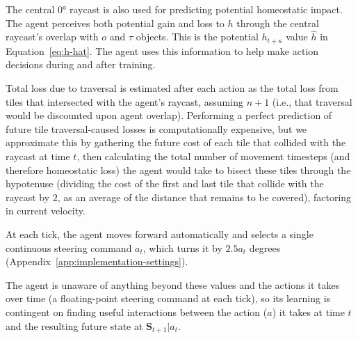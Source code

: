 \documentclass[12pt,fleqn]{article}
\begin{document}
The central 0° raycast is also used for predicting potential homeostatic impact. The agent perceives both potential gain and loss to \(h\) through the central raycast's  overlap with \(o\) and \(\tau\) objects. This is the potential \(h_{t+\kappa}\) value \(\hat{h}\) in Equation~\ref{eq:h-hat}. The agent uses this information to help make action decisions during and after training.

Total loss due to traversal is estimated after each action as the total loss from tiles that intersected with the agent's raycast, assuming \(n+1\) (i.e., that traversal would be discounted upon agent overlap). Performing a perfect prediction of future tile traversal-caused losses is computationally expensive, but we approximate this by gathering the future cost of each tile that collided with the raycast at time \(t\), then calculating the total number of movement timesteps (and therefore homeostatic loss) the agent would take to bisect these tiles through the hypotenuse (dividing the cost of the first and last tile that collide with the raycast by \(2\), as an average of the distance that remains to be covered), factoring in current velocity.

At each tick, the agent moves forward automatically and selects a single continuous steering command $a_t$, which turns it by $2.5a_t$ degrees (Appendix~\ref{app:implementation-settings}).

The agent is unaware of anything beyond these values and the actions it takes over time (a floating-point steering command at each tick), so its learning is contingent on finding useful interactions between the action (\(a\)) it takes at time \(t\) and the resulting future state at \(\mathbf{S}_{t+1}|a_t\).
\end{document}
